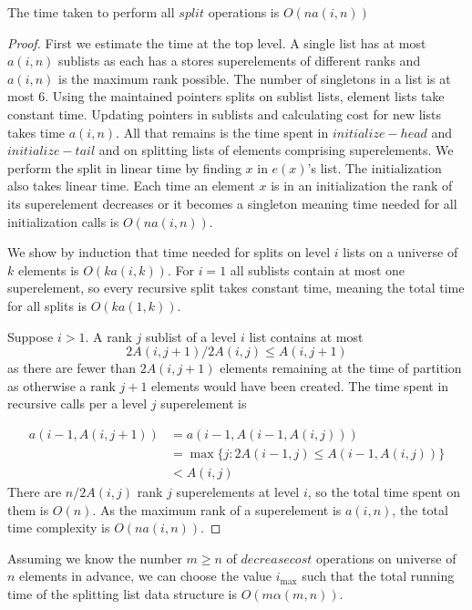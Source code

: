 \begin{theorem}
    The time taken to perform all $split$ operations is $O(na(i,n))$
\end{theorem}

\begin{proof}
    First we estimate the time at the top level. A single list has at most $a(i,n)$ sublists as each has a stores superelements of different ranks and $a(i,n)$ is the maximum rank possible. The number of singletons in a list is at most $6$. Using the maintained pointers splits on sublist lists, element lists take constant time. Updating pointers in sublists and calculating cost for new lists takes time $a(i,n)$. All that remains is the time spent in $initialize-head$ and $initialize-tail$ and on splitting lists of elements comprising superelements. We perform the split in linear time by finding $x$ in $e(x)$'s list. The initialization also takes linear time. Each time an element $x$ is in an initialization the rank of its superelement decreases or it becomes a singleton meaning time needed for all initialization calls is $O(na(i,n))$.

    We show by induction that time needed for splits on level $i$ lists on a universe of $k$ elements is $O(ka(i,k))$. For $i=1$ all sublists contain at most one superelement, so every recursive split takes constant time, meaning the total time for all splits is $O(ka(1,k))$.

    Suppose $i > 1$. A rank $j$ sublist of a level $i$ list contains at most 
    \[2A(i,j+1) / 2A(i,j) \leq A(i,j+1)\]
    as there are fewer than $2A(i,j+1)$ elements remaining at the time of partition as otherwise a rank $j+1$ elements would have been created. The time spent in recursive calls per a level $j$ superelement is

    \begin{align*}
        a(i-1,A(i,j+1)) &= a(i-1, A(i-1,A(i,j))) \\
        &= \max \{ j: 2A(i-1,j) \leq A(i-1,A(i,j)) \} \\
        &< A(i,j) 
    \end{align*}
    There are $n / 2A(i,j)$ rank $j$ superelements at level $i$, so the total time spent on them is $O(n)$. As the maximum rank of a superelement is $a(i,n)$, the total time complexity is $O(na(i,n))$.

\end{proof}

\begin{theorem}\label{thm:sfm_time}
    Assuming we know the number $m \geq n$ of $decreasecost$ operations on universe of $n$ elements in advance, we can choose the value $i_{\max}$ such that the total running time of the splitting list data structure is $O(m\alpha(m,n))$.
\end{theorem}


